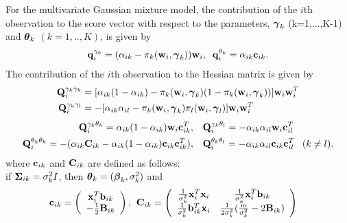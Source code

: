 \begin{theorem}
For the multivariate Gaussian mixture model, the contribution of the $i$th observation to the score vector with respect to the parameters, $\boldsymbol\gamma_{k}$ (k=1,...,K-1) and $\boldsymbol\theta_{k}$ $(k=1,..,K)$, is given by
\begin{align*}
\mathbf q_{i}^{\gamma_{k}}=(\alpha_{ik}-\pi_{k}(\mathbf w_{i},\boldsymbol\gamma_{k}))\mathbf w_{i},\;\; \mathbf q_{i}^{\theta_{k}}=\alpha_{ik}\mathbf c_{ik}.
\end{align*}
The contribution of the $i$th observation to the Hessian matrix is given by
\begin{align*}
\mathbf Q_{i}^{\gamma_{k}\gamma_{k}}&=[\alpha_{ik}(1-\alpha_{ik})-\pi_{k}(\mathbf w_{i},\boldsymbol\gamma_{k})(1-\pi_{k}(\mathbf w_{i},\boldsymbol\gamma_{k}))]\mathbf w_{i}\mathbf w_{i}^{T}\\
\mathbf Q_{i}^{\gamma_{k}\gamma_{l}}&=-[\alpha_{ik}\alpha_{il}-\pi_{k}(\mathbf w_{i},\boldsymbol\gamma_{k})\pi_{l}(\mathbf w_{i},\boldsymbol\gamma_{l})]\mathbf w_{i}\mathbf w_{i}^{T}
\end{align*}
\begin{align*}
\mathbf Q_{i}^{\gamma_{k}\theta_{k}}=\alpha_{ik}(1-\alpha_{ik})\mathbf w_{i}\mathbf c_{ik}^{T},&\quad \mathbf Q_{i}^{\gamma_{k}\theta_{l}}=-\alpha_{ik}\alpha_{il}\mathbf w_{i}\mathbf c_{il}^{T}\\
\mathbf Q_{i}^{\theta_{k}\theta_{k}}=-(\alpha_{ik}\mathbf C_{ik}-\alpha_{ik}(1-\alpha_{ik})\mathbf c_{ik}\mathbf c_{ik}^{T}\mathbf ),&\quad \mathbf Q_{i}^{\theta_{k}\theta_{l}}=-\alpha_{ik}\alpha_{il}\mathbf c_{ik}\mathbf c_{il}^{T}\;\;\;(k\not=l).
\end{align*}
where $\mathbf c_{ik}$ and $\mathbf C_{ik}$ are defined as follows:\\

if $\boldsymbol\Sigma_{ik}=\sigma_{k}^{2}I$, then $\boldsymbol\theta_{k}=(\boldsymbol\beta_{k},\sigma^{2}_{k})$ and
\begin{align*}
\mathbf c_{ik}=\left( \begin{array}{c}\mathbf x_{i}^{T}\mathbf b_{ik}\\ -\frac{1}{2} \mathbf B_{ik}\end{array}\right),&\;\;
\mathbf C_{ik}=\left(\begin{array}{cc} \frac{1}{\sigma^{2}_{k}}\mathbf x_{i}^{T}\mathbf x_{i}&\frac{1}{\sigma^{2}_{k}}\mathbf x_{i}^{T}\mathbf b_{ik}\\ \frac{1}{\sigma^{2}_{k}}\mathbf b^{T}_{ik}\mathbf x_{i}&\frac{1}{2\sigma^{2}_{k}}(\frac{m}{\sigma^{2}_{k}}-2\mathbf B_{ik})\end{array} \right)
\end{align*}


\end{theorem}
